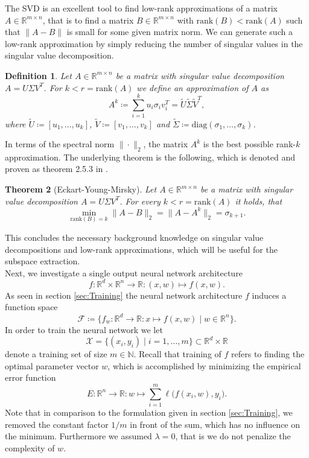 \documentclass[11pt, a4paper]{article}
\newtheorem{theorem}{Theorem}[section]
\newtheorem{definition}[theorem]{Definition}
\newcommand{\N}{\mathds{N}}
\newcommand{\R}{\mathds{R}}
\newcommand{\F}{\mathcal{F}}
\newcommand{\X}{\mathcal{X}}
\begin{document}
The SVD is an excellent tool to find low-rank approximations of a matrix $A \in \R^{m \times n}$, that is to find a matrix $B \in \R^{m \times n}$ with $\text{rank}(B) < \text{rank}(A)$ such that $\|A -B\|$ is small for some given matrix norm. We can generate such a low-rank approximation by simply reducing the number of singular values in the singular value decomposition.

\begin{definition}
Let $A \in \R^{m \times n}$ be a matrix with singular value decomposition $A=U \Sigma V^T$. For $k < r = \text{rank}(A)$ we define an approximation of $A$ as
\[ A^k \coloneq \sum_{i=1}^{k} u_i \sigma_i v_i^T = \tilde{U} \tilde{\Sigma} \tilde{V}^T, \]
where $\tilde{U} \coloneq [u_1, \dots, u_k]$, $\tilde{V} \coloneq [v_1, \dots, v_k]$ and $\tilde{\Sigma} \coloneq \text{diag}(\sigma_1, \dots, \sigma_k)$.
\end{definition}

In terms of the spectral norm $\| \cdot \|_2$, the matrix $A^k$ is the best possible rank-$k$ approximation. The underlying theorem is the following, which is denoted and proven as theorem 2.5.3 in \cite{SVD}.

\begin{theorem}[Eckart-Young-Mirsky] \label{thm:eym}
Let $A \in \R^{m \times n}$ be a matrix with singular value decomposition $A= U \Sigma V^T$. For every $k < r = \text{rank}(A)$ it holds, that
\[ \min_{\text{rank}(B)=k} \big \| A-B \big \|_2 = \big \| A - A^k \big \|_2 = \sigma_{k+1}. \]
\end{theorem}

This concludes the necessary background knowledge on singular value decompositions and low-rank approximations, which will be useful for the subspace extraction. \\

Next, we investigate a single output neural network architecture 
\[ f: \R^d \times \R^n \to \R : (x,w) \mapsto f(x,w). \]
As seen in section \ref{sec:Training} the neural network architecture $f$ induces a function space
\[ \F \coloneq \Big \{ f_w : \R^d \to \R : x \mapsto f(x,w) \mid w \in \R^n \Big \}. \]
In order to train the neural network we let
\[ \X = \big \{ (x_i,y_i) \mid i=1, \dots, m \big \} \subset \R^d \times \R \] 
denote a training set of size $m \in \N$. Recall that training of $f$ refers to finding the optimal parameter vector $w$, which is accomplished by minimizing the empirical error function
\[ E : \R^n \to \R : w \mapsto \sum_{i=1}^{m} \ell \big (f(x_i,w), y_i \big ). \]
Note that in comparison to the formulation given in section \ref{sec:Training}, we removed the constant factor $1/m$ in front of the sum, which has no influence on the minimum. Furthermore we assumed $\lambda = 0$, that is we do not penalize the complexity of $w$. \\
\end{document}
